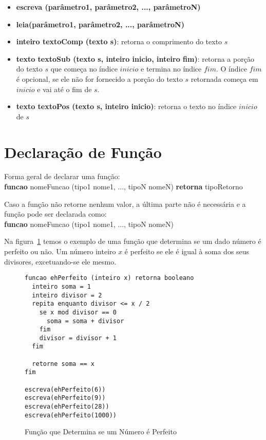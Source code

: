 \documentclass{report}
\begin{document}
\begin{itemize}
	\item \textbf{escreva (parâmetro1, parâmetro2, ..., parâmetroN)}
	
	\item \textbf{leia(parâmetro1, parâmetro2, ..., parâmetroN)}
	
	\item \textbf{inteiro textoComp (texto s)}: retorna o comprimento do texto $s$
	
	\item \textbf{texto textoSub (texto s, inteiro inicio, inteiro fim)}:
	retorna a porção do texto $s$ que começa no índice $inicio$ e termina
  no índice $fim$. O índice $fim$ é opcional, se ele não for fornecido a
  porção do texto $s$ retornada começa em $inicio$ e vai até o fim de $s$.
	
	\item \textbf{texto textoPos (texto s, inteiro inicio)}:
	retorna o texto no índice $inicio$ de $s$
\end{itemize}


\section{Declaração de Função}

Forma geral de declarar uma função: \\
\textbf{funcao} nomeFuncao (tipo1 nome1, ..., tipoN nomeN) \textbf{retorna} tipoRetorno

Caso a função não retorne nenhum valor, a última parte não é necessária e a
função pode ser declarada como: \\
\textbf{funcao} nomeFuncao (tipo1 nome1, ..., tipoN nomeN)


Na figura~\ref{fig:perfeito} temos o exemplo de uma função que
determina se um dado número é perfeito ou não. Um número inteiro
$x$ é perfeito se ele é igual à soma dos seus divisores, excetuando-se
ele mesmo. 

\begin{figure}
\begin{verbatim}
funcao ehPerfeito (inteiro x) retorna booleano
  inteiro soma = 1
  inteiro divisor = 2
  repita enquanto divisor <= x / 2
    se x mod divisor == 0
      soma = soma + divisor
    fim
    divisor = divisor + 1
  fim	

  retorne soma == x
fim

escreva(ehPerfeito(6))
escreva(ehPerfeito(9))
escreva(ehPerfeito(28))
escreva(ehPerfeito(1000))
\end{verbatim}
\caption{Função que Determina se um Número é Perfeito}
\label{fig:perfeito}
\end{figure}
\end{document}
